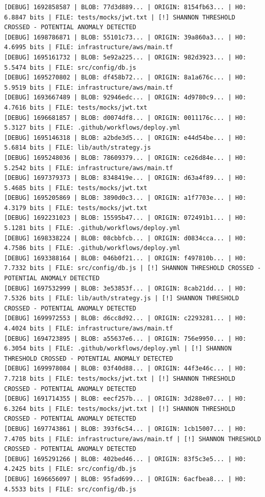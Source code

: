 \documentclass[12pt, a4paper, oneside]{report}
\begin{document}
\begin{lstlisting}[basicstyle=\tiny\ttfamily]
[DEBUG] 1692858587 | BLOB: 77d3d889... | ORIGIN: 8154fb63... | H0: 6.8847 bits | FILE: tests/mocks/jwt.txt | [!] SHANNON THRESHOLD CROSSED - POTENTIAL ANOMALY DETECTED
[DEBUG] 1698786871 | BLOB: 55101c73... | ORIGIN: 39a860a3... | H0: 4.6995 bits | FILE: infrastructure/aws/main.tf
[DEBUG] 1695161732 | BLOB: 5e92a225... | ORIGIN: 982d3923... | H0: 5.5474 bits | FILE: src/config/db.js
[DEBUG] 1695270802 | BLOB: df458b72... | ORIGIN: 8a1a676c... | H0: 5.9519 bits | FILE: infrastructure/aws/main.tf
[DEBUG] 1693667489 | BLOB: 92946edc... | ORIGIN: 4d9780c9... | H0: 4.7616 bits | FILE: tests/mocks/jwt.txt
[DEBUG] 1696681857 | BLOB: d0074df8... | ORIGIN: 0011176c... | H0: 5.3127 bits | FILE: .github/workflows/deploy.yml
[DEBUG] 1695146318 | BLOB: a2bde3d5... | ORIGIN: e44d54be... | H0: 5.6814 bits | FILE: lib/auth/strategy.js
[DEBUG] 1695248036 | BLOB: 78609379... | ORIGIN: ce26d84e... | H0: 5.2542 bits | FILE: infrastructure/aws/main.tf
[DEBUG] 1697379373 | BLOB: 8348419e... | ORIGIN: d63a4f89... | H0: 5.4685 bits | FILE: tests/mocks/jwt.txt
[DEBUG] 1695205869 | BLOB: 3890d0c3... | ORIGIN: a1f7703e... | H0: 4.3179 bits | FILE: tests/mocks/jwt.txt
[DEBUG] 1692231023 | BLOB: 15595b47... | ORIGIN: 072491b1... | H0: 5.1281 bits | FILE: .github/workflows/deploy.yml
[DEBUG] 1698338224 | BLOB: 08cbbfcb... | ORIGIN: d0834cca... | H0: 4.7586 bits | FILE: .github/workflows/deploy.yml
[DEBUG] 1693388164 | BLOB: 046b0f21... | ORIGIN: f497810b... | H0: 7.7332 bits | FILE: src/config/db.js | [!] SHANNON THRESHOLD CROSSED - POTENTIAL ANOMALY DETECTED
[DEBUG] 1697532999 | BLOB: 3e53853f... | ORIGIN: 8cab21dd... | H0: 7.5326 bits | FILE: lib/auth/strategy.js | [!] SHANNON THRESHOLD CROSSED - POTENTIAL ANOMALY DETECTED
[DEBUG] 1699972553 | BLOB: d6cc8d92... | ORIGIN: c2293281... | H0: 4.4024 bits | FILE: infrastructure/aws/main.tf
[DEBUG] 1694723895 | BLOB: a55637e6... | ORIGIN: 756e9950... | H0: 6.3054 bits | FILE: .github/workflows/deploy.yml | [!] SHANNON THRESHOLD CROSSED - POTENTIAL ANOMALY DETECTED
[DEBUG] 1699978084 | BLOB: 03f40d88... | ORIGIN: 44f3e46c... | H0: 7.7218 bits | FILE: tests/mocks/jwt.txt | [!] SHANNON THRESHOLD CROSSED - POTENTIAL ANOMALY DETECTED
[DEBUG] 1691714355 | BLOB: eecf257b... | ORIGIN: 3d288e07... | H0: 6.3264 bits | FILE: tests/mocks/jwt.txt | [!] SHANNON THRESHOLD CROSSED - POTENTIAL ANOMALY DETECTED
[DEBUG] 1697743861 | BLOB: 393f6c54... | ORIGIN: 1cb15007... | H0: 7.4705 bits | FILE: infrastructure/aws/main.tf | [!] SHANNON THRESHOLD CROSSED - POTENTIAL ANOMALY DETECTED
[DEBUG] 1695291266 | BLOB: 402bed46... | ORIGIN: 83f5c3e5... | H0: 4.2425 bits | FILE: src/config/db.js
[DEBUG] 1696656097 | BLOB: 95fad699... | ORIGIN: 6acfbea8... | H0: 4.5533 bits | FILE: src/config/db.js
\end{lstlisting}
\end{document}
